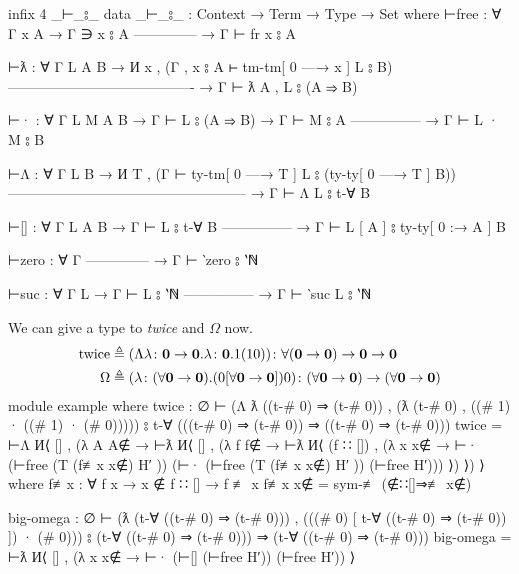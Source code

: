 \documentclass[logo,bsc,singlespacing,parskip,online]{infthesis}
\renewenvironment{code}{\mintedcopy[breaklines,breaksymbolleft=\;]{agda}}{\endmintedcopy}
\begin{document}
\begin{code}
  infix  4 _⊢_⦂_
  data _⊢_⦂_ : Context → Term → Type → Set where
    ⊢free : ∀ {Γ x A}
      → Γ ∋ x ⦂ A
        --------------
      → Γ ⊢ fr x ⦂ A

    ⊢ƛ : ∀ {Γ L A B}
      → И x , (Γ , x ⦂ A ⊢ tm-tm[ 0 —→ x ] L ⦂ B)
        ----------------------------------------
      → Γ ⊢ ƛ A , L ⦂ (A ⇒ B)

    ⊢· : ∀ {Γ L M A B}
      → Γ ⊢ L ⦂ (A ⇒ B)
      → Γ ⊢ M ⦂ A
        ---------------
      → Γ ⊢ L · M ⦂ B

    ⊢Λ : ∀ {Γ L B}
      → И T , (Γ ⊢ ty-tm[ 0 —→ T ] L ⦂ (ty-ty[ 0 —→ T ] B))
        ---------------------------------------------------
      → Γ ⊢ Λ L ⦂ t-∀ B

    ⊢[] : ∀ {Γ L A B}
      → Γ ⊢ L ⦂ t-∀ B
        ---------------
      → Γ ⊢ L [ A ] ⦂ ty-ty[ 0 :→ A ] B

    ⊢zero : ∀ {Γ}
        --------------
      → Γ ⊢ ‵zero ⦂ ‵ℕ

    ⊢suc : ∀ {Γ L}
      → Γ ⊢ L ⦂ ‵ℕ
        ---------------
      → Γ ⊢ ‵suc L ⦂ ‵ℕ
\end{code}

We can give a type to \textit{twice} and $\Omega$ now.
\begin{align}
\label{equation:twice_big_omega}
  \text{twice} &\triangleq (\Lambda \lambda \colon \mathbf{0} \to \mathbf{0}. \lambda \colon \mathbf{0}. 1(10))
    \colon \forall (\mathbf{0} \to \mathbf{0}) \to \mathbf{0} \to \mathbf{0}\\
  \Omega &\triangleq (\lambda \colon (\forall \mathbf{0} \to \mathbf{0}). (0 [\forall \mathbf{0} \to \mathbf{0}]) 0)
    \colon (\forall \mathbf{0} \to \mathbf{0}) \to (\forall \mathbf{0} \to \mathbf{0}) \notag
\end{align}
\begin{code}
  module example where
    twice : ∅ ⊢ (Λ ƛ ((t-# 0) ⇒ (t-# 0))
      , (ƛ (t-# 0) , ((# 1) · ((# 1) · (# 0)))))
        ⦂ t-∀ (((t-# 0) ⇒ (t-# 0))
          ⇒ ((t-# 0) ⇒ (t-# 0)))
    twice = ⊢Λ И⟨ [] , (λ A {A∉} → ⊢ƛ И⟨ [] , (λ f {f∉} →
      ⊢ƛ И⟨ (f ∷ []) , (λ x {x∉} → ⊢·
        (⊢free (T (f≢x x∉) H′ ))
        (⊢· (⊢free (T (f≢x x∉) H′ )) (⊢free H′))) ⟩) ⟩) ⟩
      where
        f≢x : ∀ {f x} → x ∉ f ∷ [] → f ≢ x
        f≢x x∉ = sym-≢ (∉∷[]⇒≢ x∉)

    big-omega : ∅ ⊢ (ƛ (t-∀ ((t-# 0) ⇒ (t-# 0)))
      , (((# 0) [ t-∀ ((t-# 0) ⇒ (t-# 0)) ]) · (# 0)))
        ⦂ (t-∀ ((t-# 0) ⇒ (t-# 0)))
          ⇒ (t-∀ ((t-# 0) ⇒ (t-# 0)))
    big-omega =
      ⊢ƛ И⟨ [] , (λ x {x∉} → ⊢· (⊢[] (⊢free H′)) (⊢free H′)) ⟩
\end{code}
\end{document}
